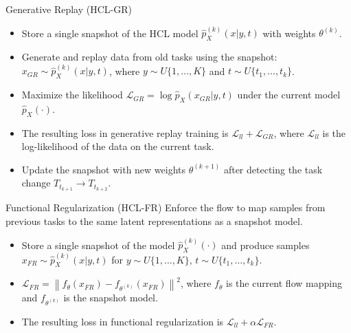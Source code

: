 \documentclass{beamer}
\begin{document}
\begin{frame}{Generative Replay (HCL-GR)}
  \begin{itemize}
    \item <1-> Store a single snapshot of the HCL model $\hat{p}_X^{(k)}(x | y, t)$ with weights $\theta^{(k)}$.
    \item <1-> Generate and replay data from old tasks using the snapshot: $x_{GR} \sim \hat{p}_X^{(k)}(x | y, t)$, where $y \sim U\{1, \dots, K\}$ and $t \sim U\{t_1, \dots, t_k\}$.
    \item <1-> Maximize the likelihood $\mathcal{L}_{GR} = \log \hat{p}_X (x_{GR} | y, t)$ under the current model $\hat{p}_X(\cdot)$.
    \item <1-> The resulting loss in generative replay training is $\mathcal{L}_{ll} + \mathcal{L}_{GR}$, where $\mathcal{L}_{ll}$ is the log-likelihood of the data on the current task.
    \item <1-> Update the snapshot with new weights $\theta^{(k+1)}$ after detecting the task change $T_{t_{k+1}} \rightarrow T_{t_{k+2}}$. 
  \end{itemize}
\end{frame}

\begin{frame}{Functional Regularization (HCL-FR)}
  Enforce the flow to map samples from previous tasks to the same latent representations as a snapshot model.

  \begin{itemize}
    \item <1-> Store a single snapshot of the model $\hat{p}_X^{(k)}(\cdot)$ and produce samples $x_{FR} \sim \hat{p}_X^{(k)}(x | y, t)$ for $y \sim U\{1, \dots, K\}$, $t \sim U\{t_1, \dots, t_k\}$.
    \item <1-> $\mathcal{L}_{FR} = \left\| f_\theta(x_{FR}) - f_{\theta^{(k)}}(x_{FR}) \right\|^2$, where $f_\theta$ is the current flow mapping and $f_{\theta^{(k)}}$ is the snapshot model.
    \item <1-> The resulting loss in functional regularization is $\mathcal{L}_{ll} + \alpha \mathcal{L}_{FR}$.
  \end{itemize}
\end{frame}

\end{document}
